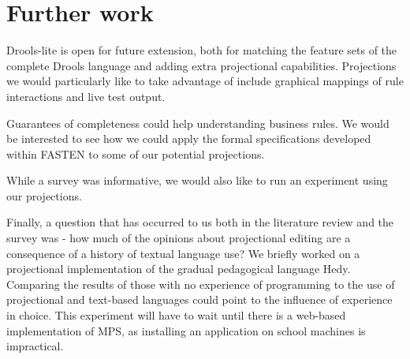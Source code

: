 \section{Further work}

Drools-lite is open for future extension, both for matching the feature sets of the complete Drools language and adding extra projectional capabilities.
Projections we would particularly like to take advantage of include graphical mappings of rule interactions and live test output.

Guarantees of completeness could help understanding business rules.
We would be interested to see how we could apply the formal specifications developed within FASTEN\cite{ratiu2019fasten} to some of our potential projections.

While a survey was informative, we would also like to run an experiment using our projections.

Finally, a question that has occurred to us both in the literature review and the survey was - how much of the opinions about projectional editing are a consequence of a history of textual language use?
We briefly worked on a projectional implementation of the gradual pedagogical language Hedy\cite{hermans2020hedy}.
Comparing the results of those with no experience of programming to the use of projectional and text-based languages could point to the influence of experience in choice.
This experiment will have to wait until there is a web-based implementation of MPS, as installing an application on school machines is impractical.
